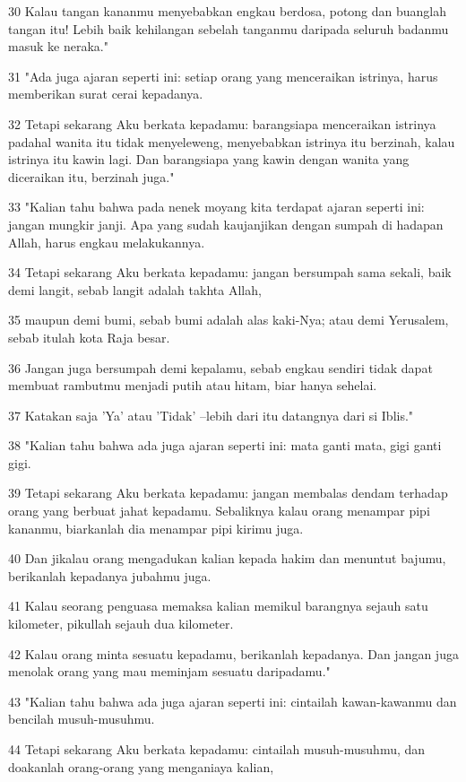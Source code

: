 \par 30 Kalau tangan kananmu menyebabkan engkau berdosa, potong dan buanglah tangan itu! Lebih baik kehilangan sebelah tanganmu daripada seluruh badanmu masuk ke neraka."
\par 31 "Ada juga ajaran seperti ini: setiap orang yang menceraikan istrinya, harus memberikan surat cerai kepadanya.
\par 32 Tetapi sekarang Aku berkata kepadamu: barangsiapa menceraikan istrinya padahal wanita itu tidak menyeleweng, menyebabkan istrinya itu berzinah, kalau istrinya itu kawin lagi. Dan barangsiapa yang kawin dengan wanita yang diceraikan itu, berzinah juga."
\par 33 "Kalian tahu bahwa pada nenek moyang kita terdapat ajaran seperti ini: jangan mungkir janji. Apa yang sudah kaujanjikan dengan sumpah di hadapan Allah, harus engkau melakukannya.
\par 34 Tetapi sekarang Aku berkata kepadamu: jangan bersumpah sama sekali, baik demi langit, sebab langit adalah takhta Allah,
\par 35 maupun demi bumi, sebab bumi adalah alas kaki-Nya; atau demi Yerusalem, sebab itulah kota Raja besar.
\par 36 Jangan juga bersumpah demi kepalamu, sebab engkau sendiri tidak dapat membuat rambutmu menjadi putih atau hitam, biar hanya sehelai.
\par 37 Katakan saja 'Ya' atau 'Tidak' --lebih dari itu datangnya dari si Iblis."
\par 38 "Kalian tahu bahwa ada juga ajaran seperti ini: mata ganti mata, gigi ganti gigi.
\par 39 Tetapi sekarang Aku berkata kepadamu: jangan membalas dendam terhadap orang yang berbuat jahat kepadamu. Sebaliknya kalau orang menampar pipi kananmu, biarkanlah dia menampar pipi kirimu juga.
\par 40 Dan jikalau orang mengadukan kalian kepada hakim dan menuntut bajumu, berikanlah kepadanya jubahmu juga.
\par 41 Kalau seorang penguasa memaksa kalian memikul barangnya sejauh satu kilometer, pikullah sejauh dua kilometer.
\par 42 Kalau orang minta sesuatu kepadamu, berikanlah kepadanya. Dan jangan juga menolak orang yang mau meminjam sesuatu daripadamu."
\par 43 "Kalian tahu bahwa ada juga ajaran seperti ini: cintailah kawan-kawanmu dan bencilah musuh-musuhmu.
\par 44 Tetapi sekarang Aku berkata kepadamu: cintailah musuh-musuhmu, dan doakanlah orang-orang yang menganiaya kalian,
